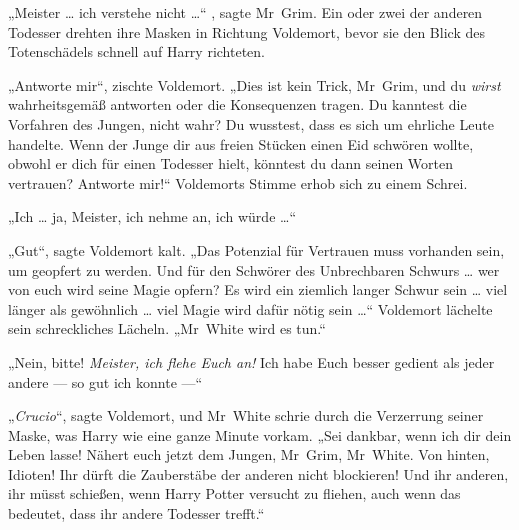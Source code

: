 „Meister … ich verstehe nicht …“ , sagte Mr~Grim.
Ein oder zwei der anderen Todesser drehten ihre Masken in Richtung Voldemort, bevor sie den Blick des Totenschädels schnell auf Harry richteten.

„Antworte mir“, zischte Voldemort.
„Dies ist kein Trick, Mr~Grim, und du \emph{wirst} wahrheitsgemäß antworten oder die Konsequenzen tragen. Du kanntest die Vorfahren des Jungen, nicht wahr? Du wusstest, dass es sich um ehrliche Leute handelte. Wenn der Junge dir aus freien Stücken einen Eid schwören wollte, obwohl er dich für einen Todesser hielt, könntest du dann seinen Worten vertrauen? Antworte mir!“
Voldemorts Stimme erhob sich zu einem Schrei.

„Ich … ja, Meister, ich nehme an, ich würde …“

„Gut“, sagte Voldemort kalt.
„Das Potenzial für Vertrauen muss vorhanden sein, um geopfert zu werden. Und für den Schwörer des Unbrechbaren Schwurs … wer von euch wird seine Magie opfern? Es wird ein ziemlich langer Schwur sein … viel länger als gewöhnlich … viel Magie wird dafür nötig sein …“
Voldemort lächelte sein schreckliches Lächeln.
„Mr~White wird es tun.“

„Nein, bitte! \emph{Meister, ich flehe Euch an!} Ich habe Euch besser gedient als jeder andere — so gut ich konnte —“

„\emph{Crucio}“, sagte Voldemort, und Mr~White schrie durch die Verzerrung seiner Maske, was Harry wie eine ganze Minute vorkam.
„Sei dankbar, wenn ich dir dein Leben lasse! Nähert euch jetzt dem Jungen, Mr~Grim, Mr~White. Von hinten, Idioten! Ihr dürft die Zauberstäbe der anderen nicht blockieren! Und ihr anderen, ihr müsst schießen, wenn Harry Potter versucht zu fliehen, auch wenn das bedeutet, dass ihr andere Todesser trefft.“

